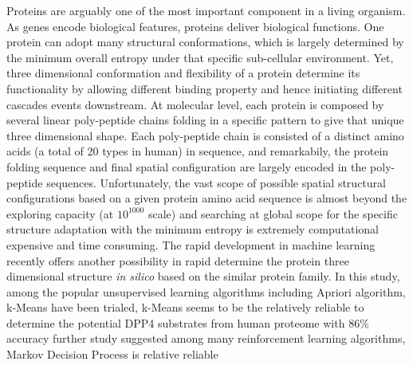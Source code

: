 Proteins are arguably one of the most important component in a living organism. As genes encode biological features, proteins deliver biological functions. One protein can adopt many structural conformations, which is largely determined by the minimum overall entropy under that specific sub-cellular environment. Yet, three dimensional conformation and flexibility of a protein determine its functionality by allowing different binding property and hence initiating different cascades events downstream. At molecular level, each protein is composed by several linear poly-peptide chains folding in a specific pattern to give that unique three dimensional shape. Each poly-peptide chain is consisted of a distinct amino acids (a total of 20 types in human) in sequence, and remarkabily, the protein folding sequence and final spatial configuration are largely encoded in the poly-peptide sequences. Unfortunately, the vast scope of possible spatial structural configurations based on a given protein amino acid sequence is almost beyond the exploring capacity (at $10^{1000}$ scale) and searching at global scope for the specific structure adaptation with the minimum entropy is extremely computational expensive and time consuming. The rapid development in machine learning recently offers another possibility in rapid determine the protein three dimensional structure \textit{in silico} based on the similar protein family. In this study, among the popular unsupervised learning algorithms including Apriori algorithm, k-Means have been trialed, k-Means seems to be the relatively reliable to determine the potential DPP4 substrates from human proteome with 86\% accuracy further study suggested among many reinforcement learning algorithms, Markov Decision Process is relative reliable